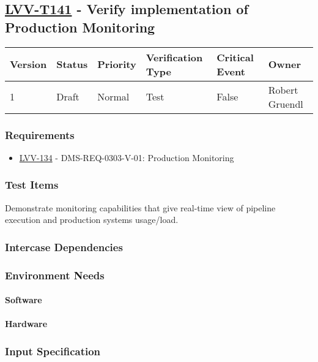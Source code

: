 \subsection{\href{https://jira.lsstcorp.org/secure/Tests.jspa\#/testCase/LVV-T141}{LVV-T141}
    - Verify implementation of Production Monitoring}\label{lvv-t141}

\begin{longtable}[]{llllll}
\toprule
Version & Status & Priority & Verification Type & Critical Event & Owner
\\\midrule
1 & Draft & Normal &
Test & False & Robert Gruendl
\\\bottomrule
\end{longtable}

\subsubsection{Requirements}
\begin{itemize}
\item \href{https://jira.lsstcorp.org/browse/LVV-134}{LVV-134} - DMS-REQ-0303-V-01: Production Monitoring
\end{itemize}

\subsubsection{Test Items}
Demonstrate monitoring capabilities that give real-time view of pipeline
execution and production systems usage/load.



\subsubsection{Intercase Dependencies}

\subsubsection{Environment Needs}

\paragraph{Software}

\paragraph{Hardware}

\subsubsection{Input Specification}

